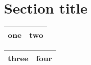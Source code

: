 \documentclass[11pt]{article}
\begin{document}
   \section{Section title}
     \begin{tabular}{|r|l|}\hline
       one & two \\ \hline
     \end{tabular}
 
     \bigskip
     \noindent
     \begin{tabular}{|r|l|}\hline
       three & four \\ \hline
     \end{tabular}
\end{document}
